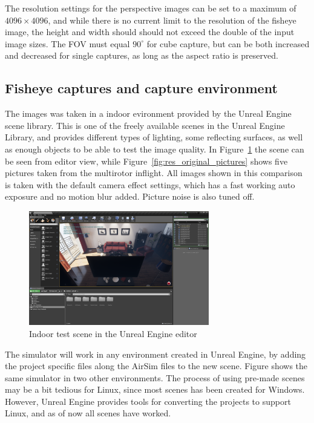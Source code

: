 The resolution settings for the perspective images can be set to a maximum of $4096\times4096$, and while there is no current limit to the resolution of the fisheye image, the height and width should should not exceed the double of the input image sizes. The FOV must equal $90^\circ$ for cube capture, but can be both increased and decreased for single captures, as long as the aspect ratio is preserved. 

\subsection{Fisheye captures and capture environment}

The images was taken in a indoor evironment provided by the Unreal Engine scene library. This is one of the freely available scenes in the Unreal Engine Library, and provides different types of lighting, some reflecting surfaces, as well as enough objects to be able to test the image quality. In Figure~\ref{fig:res_indoor_with_editor} the scene can be seen from editor view, while Figure~\ref{fig:res_original_pictures} shows five pictures taken from the multirotor inflight. All images shown in this comparison is taken with the default camera effect settings, which has a fast working auto exposure and no motion blur added. Picture noise is also tuned off.

\begin{figure}[!htb]
    \centering
    \includegraphics[width = 0.7\textwidth]{rapport/fig/Results/indoor_noconnect.png}
    \caption{Indoor test scene in the Unreal Engine editor}
    \label{fig:res_indoor_with_editor}
\end{figure}

The simulator will work in any environment created in Unreal Engine, by adding the project specific files along the AirSim files to the new scene. Figure  shows the same simulator in two other environments. The process of using pre-made scenes may be a bit tedious for Linux, since most scenes has been created for Windows. However, Unreal Engine provides tools for converting the projects to support Linux, and as of now all scenes have worked.

